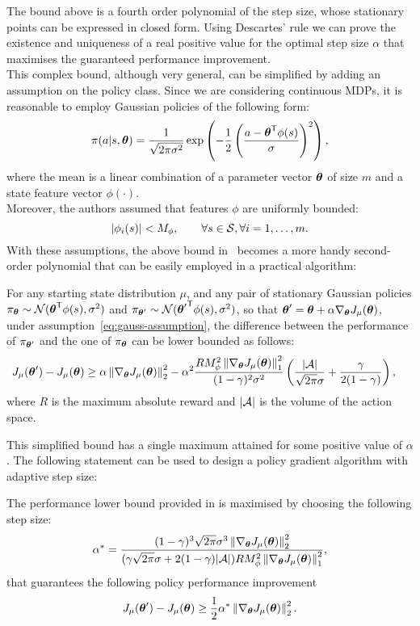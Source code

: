 The bound above is a fourth order polynomial of the step size, whose stationary points can be expressed in closed form. Using Descartes' rule we can prove the existence and uniqueness of a real positive value for the optimal step size $\alpha$ that maximises the guaranteed performance improvement. \\
This complex bound, although very general, can be simplified by adding an assumption on the policy class. Since we are considering continuous MDPs, it is reasonable to employ Gaussian policies of the following form:
\[
\pi(a|s,\vtheta)=\frac{1}{\sqrt{2\pi\sigma^2}}\exp\left( -\frac{1}{2}\left( \frac{a-\transpose{\vtheta}\phi(s)}{\sigma} \right)^2 \right),
\]
where the mean is a linear combination of a parameter vector $\vtheta$ of size $m$ and a state feature vector $\phi(\cdot)$.\\
Moreover, the authors assumed that features $\phi$ are uniformly bounded:
\begin{equation}
\label{eq:gauss-assumption}
|\phi_i(s)|<M_\phi,\qquad\forall s \in \sspace, \forall i = 1,\ldots,m.
\end{equation}
With these assumptions, the above bound in~ becomes a more handy second-order polynomial that can be easily employed in a practical algorithm:
\begin{theorem}
\label{th:adaptive-gauss-bound}
For any starting state distribution $\mu$, and any pair of stationary Gaussian policies $\pi_{\vtheta}\sim\mathcal{N}(\transpose{\vtheta}\phi(s), \sigma^2)$ and $\pi_{\vtheta '}\sim\mathcal{N}(\transpose{\vtheta'}\phi(s), \sigma^2)$, so that $\vtheta' = \vtheta + \alpha\gradj$, under assumption~\ref{eq:gauss-assumption}, the difference between the performance of $\pi_{\vtheta'}$ and the one of $\pi_{\vtheta}$ can be lower bounded as follows:
\begin{align*}
J_\mu(\vtheta') - J_\mu(\vtheta) &\geq \alpha\norm[2]{\gradj}^2- \alpha^2\frac{RM_\phi^2\norm[1]{\gradj}^2}{(1-\gamma)^2\sigma^2}\left(\frac{|\aspace|}{\sqrt{2\pi}\sigma}+\frac{\gamma}{2(1-\gamma)}\right),
\end{align*}
where $R$ is the maximum absolute reward and $|\aspace|$ is the volume of the action space. 
\end{theorem}

This simplified bound has a single maximum attained for some positive value of $\alpha$. The following statement can be used to design a policy gradient algorithm with adaptive step size:
\begin{corollary}
\label{th:simplified-gauss-bound}
The performance lower bound provided in  is maximised by choosing the following step size:
\footnotesize
\[
\alpha^* = \frac{(1-\gamma)^3\sqrt{2\pi}\sigma^3\norm[2]{\gradj}^2}{(\gamma\sqrt{2\pi}\sigma +2(1-\gamma)|\aspace|)RM_\phi^2\norm[1]{\gradj}^2},
\]
\normalsize
that guarantees the following policy performance improvement
\[
J_\mu(\vtheta') - J_\mu(\vtheta) \geq \frac{1}{2}\alpha^* \norm[2]{\gradj}^2.
\]
\end{corollary}


